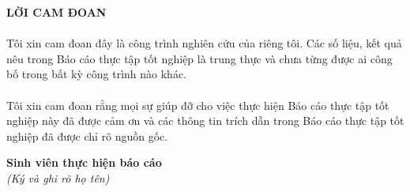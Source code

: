     \pagestyle{fancy}
	\fancyhf{}
	\chead{\thepage}
	\renewcommand{\headrulewidth}{0pt}
	\begin{center}
		\setcounter{page}{1}
		\fontsize{16}{20}\selectfont
		\textbf{LỜI CAM ĐOAN\\} 
	\end{center}
	\fontsize{13}{13}\selectfont
	\paragraph{}
	Tôi xin cam đoan đây là công trình nghiên cứu của riêng tôi. Các số liệu, kết quả nêu trong Báo cáo thực tập tốt nghiệp là trung thực và chưa từng được ai công bố trong bất kỳ công trình nào khác.
	\paragraph{}
    	Tôi xin cam đoan rằng mọi sự giúp đỡ cho việc thực hiện Báo cáo thực tập tốt nghiệp này 
    đã được cảm ơn và các thông tin trích dẫn trong Báo cáo thực tập tốt nghiệp đã được chỉ rõ nguồn gốc.
	
	\begin{flushright}
            \textbf {Sinh viên thực hiện báo cáo} \\
            \textit{(Ký và ghi rõ họ tên)}
	\end{flushright}
	\pagebreak	